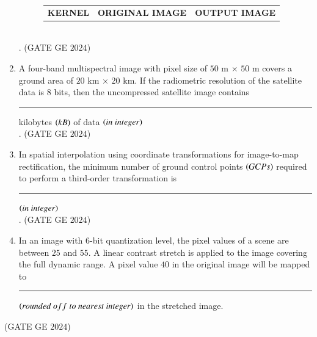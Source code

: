 \documentclass[journal,12pt,onecolumn]{IEEEtran}
\theoremstyle{remark}
\begin{document}
\begin{enumerate}
\begin{figure}[h!]
    \begin{tabular}{c c c}
        \hspace{2cm}
        \textbf{KERNEL} & \hspace{1cm} \textbf{ORIGINAL IMAGE} & \hspace{1cm} \textbf{OUTPUT 
IMAGE}
    \end{tabular}
\end{figure}\\.
\hfill{(GATE GE $2024$)}
\bigskip
\item A four-band multispectral image with pixel size of $50$ m $\times$ $50$ m covers a ground area of $20$ km $\times$ $20$ km.
If the radiometric resolution of the satellite data is $8$ bits, then the uncompressed satellite image contains \rule{2cm}{0.5mm} kilobytes $\left(kB\right)$ of data $\left(in\ integer\right)$\\.
\hfill{(GATE GE $2024$)}
\bigskip
\item In spatial interpolation using coordinate transformations for image-to-map rectification, the minimum number of ground control points $\left(GCPs\right)$ required to perform a third-order transformation is \rule{2cm}{0.5mm} $\left(in\ integer\right)$\\.
\hfill{(GATE GE $2024$)}
\bigskip
\item In an image with $6$-bit quantization level, the pixel values of a scene are between $25$ and $55$. A linear contrast stretch is applied to the image covering the full dynamic range.
A pixel value $40$ in the original image will be mapped to \rule{2cm}{0.5mm} $\brak{rounded\ off\ to\ nearest\ integer}$ in the stretched image.
\end{enumerate}
\hfill{(GATE GE $2024$)}
\bigskip
\end{document}
